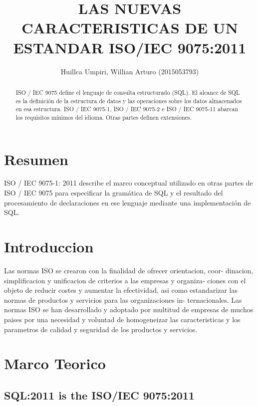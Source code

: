 \documentclass[preprint,12pt]{elsarticle}
\begin{document}
	
	\begin{frontmatter}

		\title{\huge LAS NUEVAS CARACTERISTICAS DE UN ESTANDAR ISO/IEC 9075:2011}
		
		\author{Huillca Umpiri, Willian Arturo (2015053793)}

		
		\address{Tacna, Perú}
		
		\begin{abstract}
ISO / IEC 9075 define el lenguaje de consulta estructurado (SQL). El alcance de SQL es la definición de la estructura de datos y las operaciones sobre los datos almacenados en esa estructura. ISO / IEC 9075-1, ISO / IEC 9075-2 e ISO / IEC 9075-11 abarcan los requisitos mínimos del idioma. Otras partes definen extensiones.
		\end{abstract}
\end{frontmatter}

	\section{Resumen}
	
ISO / IEC 9075-1: 2011 describe el marco conceptual utilizado en otras partes de ISO / IEC 9075 para especificar la gramática de SQL y el resultado del procesamiento de declaraciones en ese lenguaje mediante una implementación de SQL.

\section{Introduccion}

Las normas ISO se crearon con la finalidad de ofrecer orientacion, coor- dinacion, simplificacion y unificacion de criterios a las empresas y organiza- ciones con el objeto de reducir costes y aumentar la efectividad, asi como estandarizar las normas de productos y servicios para las organizaciones in- ternacionales. Las normas ISO se han desarrollado y adoptado por multitud de empresas de muchos paises por una necesidad y voluntad de homogeneizar las caracteristicas y los parametros de calidad y seguridad de los productos y servicios.


\section{Marco Teorico}
	
\subsection{SQL:2011 is the ISO/IEC 9075:2011}	
\end{document}
